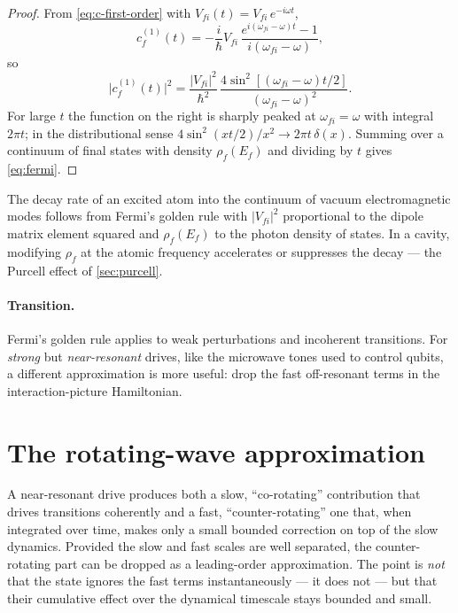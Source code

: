 \begin{proof}
From \cref{eq:c-first-order} with $V_{fi}(t)=V_{fi}\,e^{-i\omega t}$,
\begin{equation}
c_f^{(1)}(t) = -\frac{i}{\hbar}V_{fi}\,
\frac{e^{i(\omega_{fi}-\omega)t}-1}{i(\omega_{fi}-\omega)},
\end{equation}
so
\begin{equation}
\bigl|c_f^{(1)}(t)\bigr|^2
= \frac{|V_{fi}|^2}{\hbar^2}\,\frac{4\sin^2[(\omega_{fi}-\omega)t/2]}{(\omega_{fi}-\omega)^2}.
\end{equation}
For large $t$ the function on the right is sharply peaked at
$\omega_{fi}=\omega$ with integral $2\pi t$; in the distributional
sense $4\sin^2(xt/2)/x^2\to 2\pi t\,\delta(x)$. Summing over a
continuum of final states with density $\rho_f(E_f)$ and dividing by
$t$ gives \cref{eq:fermi}.
\end{proof}

\begin{example}
The decay rate of an excited atom into the continuum of vacuum
electromagnetic modes follows from Fermi's golden rule with
$|V_{fi}|^2$ proportional to the dipole matrix element squared and
$\rho_f(E_f)$ to the photon density of states. In a cavity,
modifying $\rho_f$ at the atomic frequency accelerates or suppresses
the decay --- the Purcell effect of \cref{sec:purcell}.
\end{example}

\paragraph{Transition.}
Fermi's golden rule applies to weak perturbations and incoherent
transitions. For \emph{strong} but \emph{near-resonant} drives, like
the microwave tones used to control qubits, a different
approximation is more useful: drop the fast off-resonant terms in
the interaction-picture Hamiltonian.

\section{The rotating-wave approximation}
\label{sec:rwa}

\begin{phenomenon}
A near-resonant drive produces both a slow, ``co-rotating''
contribution that drives transitions coherently and a fast,
``counter-rotating'' one that, when integrated over time, makes
only a small bounded correction on top of the slow dynamics.
Provided the slow and fast scales are well separated, the
counter-rotating part can be dropped as a leading-order
approximation. The point is \emph{not} that the state ignores the
fast terms instantaneously --- it does not --- but that their
cumulative effect over the dynamical timescale stays bounded and
small.
\end{phenomenon}

